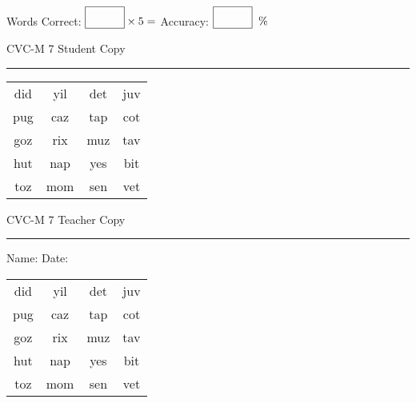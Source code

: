 \documentclass{memoir}
\begin{document}
\small

Words Correct: $\fbox{\phantom{\huge 100}} \times 5 = $ Accuracy: $\fbox{\phantom{\huge 100}}\;\; \%$ 

\vfill

\newpage


\footnotesize \noindent
CVC-M 7 \hfill Student Copy
\smallskip
\hrule

\Large

\setlength{\tabcolsep}{14pt}
\def\arraystretch{2}

{\selectfont


\begin{vplace}[0.5]
\begin{center}
\begin{tabular}{cccc}
did & yil & det & juv \\
pug & caz & tap & cot \\
goz & rix & muz & tav \\
hut & nap & yes & bit \\
toz & mom & sen & vet \\
\end{tabular}
\end{center}
\end{vplace}

}

\newpage

\footnotesize \noindent
CVC-M 7 \hfill Teacher Copy
\smallskip
\hrule

\small

\vfill

\noindent
Name: \underline{\hspace{1.75in}} \hfill Date: \underline{\hspace{1in}}

\Large

{\selectfont


\begin{vplace}[0.5]
\begin{center}
\begin{tabular}{cccc}
did & yil & det & juv \\
pug & caz & tap & cot \\
goz & rix & muz & tav \\
hut & nap & yes & bit \\
toz & mom & sen & vet \\
\end{tabular}
\end{center}
\end{vplace}



}
\end{document}
